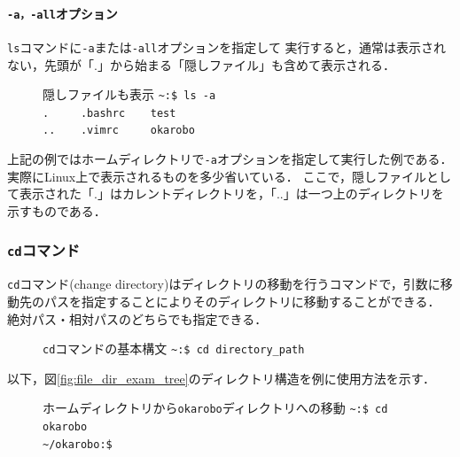 \documentclass[autodetect-engine,dvi=dvipdfmx,ja=standard,a4j]{bxjsarticle}
\newcommand{\cmd}[1]{\textcolor{yellow!70!white} {#1}}
\newcommand{\dirpath}[1]{\textcolor{Cerulean}{#1}}
\newcommand{\prompt}[1]{\texttt{\dirpath{#1}:\$ }}
\newcommand{\termtext}[2]{\Large{\prompt{#1}\texttt{#2}}}
\begin{document}
\paragraph*{ \texttt{-a，-all}オプション}
\verb|ls|コマンドに\verb|-a|または\verb|-all|オプションを指定して
実行すると，通常は表示されない，先頭が「.」から始まる「隠しファイル」も含めて表示される．

\begin{figure}[H]
    \begin{terminal}{隠しファイルも表示}
        \termtext{\textasciitilde}{\cmd{ls} -a} \\
        \texttt{\textcolor{dircolor}{.} \ \ \ \ .bashrc \ \ \ \textcolor{dircolor}{test}} \\
        \texttt{\textcolor{dircolor}{..} \ \ \ .vimrc \ \ \ \ \textcolor{dircolor}{okarobo}} 
    \end{terminal}
\end{figure}

上記の例ではホームディレクトリで\verb|-a|オプションを指定して実行した例である．
実際にLinux上で表示されるものを多少省いている．
ここで，隠しファイルとして表示された「.」はカレントディレクトリを，「..」は一つ上のディレクトリを示すものである．

\subsubsection{\textbf{\texttt{cd}コマンド}}
\verb|cd|コマンド(change directory)はディレクトリの移動を行うコマンドで，引数に移動先のパスを指定することによりそのディレクトリに移動することができる．
絶対パス・相対パスのどちらでも指定できる．

\begin{figure}[H]
    \begin{terminal}{\texttt{cd}コマンドの基本構文}
        \termtext{\textasciitilde}{\cmd{cd} directory\_path}
    \end{terminal}
\end{figure}

以下，図\ref{fig:file_dir_exam_tree}のディレクトリ構造を例に使用方法を示す．

\begin{figure}[H]
    \begin{terminal}{ホームディレクトリから\texttt{okarobo}ディレクトリへの移動}
        \termtext{\textasciitilde}{\cmd{cd} okarobo} \\
        \termtext{\textasciitilde/okarobo}{}
    \end{terminal}
\end{figure}
\end{document}
